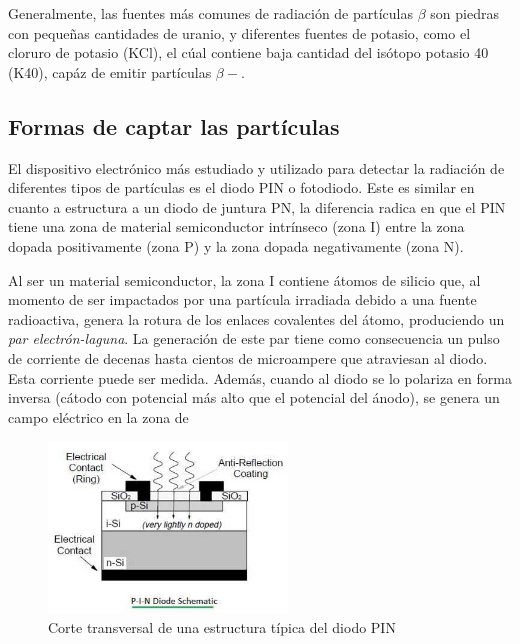 \documentclass[a4paper,conference]{IEEEtran}
\begin{document}
        Generalmente, las fuentes más comunes de radiación de partículas $\beta$
        son piedras con pequeñas cantidades de uranio, y diferentes fuentes de
        potasio, como el cloruro de potasio (KCl), el cúal contiene baja
        cantidad del isótopo potasio 40 (K40), capáz de emitir partículas
        $\beta-$.

    \subsection{Formas de captar las partículas}
       El dispositivo electrónico más estudiado y utilizado para detectar
       la radiación de diferentes tipos de partículas es el diodo PIN o
       fotodiodo. Este es similar en cuanto a estructura a un diodo de juntura
       PN, la diferencia radica en que el PIN tiene una zona de material
       semiconductor intrínseco (zona I) entre la zona dopada positivamente (zona P) y la zona
       dopada negativamente (zona N).\par
       Al ser un material semiconductor, la zona I contiene átomos
       de silicio que, al momento de ser impactados por una partícula
       irradiada debido a una fuente radioactiva, genera la rotura de los
       enlaces covalentes del átomo, produciendo un \emph{par electrón-laguna}.
       La generación de este par tiene como consecuencia un pulso de corriente
       de decenas hasta cientos de microampere que atraviesan al diodo. Esta
       corriente puede ser medida. Además, cuando al diodo se lo polariza en
       forma inversa (cátodo con potencial más alto que el potencial del ánodo),
       se genera un campo eléctrico en la zona de
       \newpage
       \begin{figure}[!t]
           \centering
           \includegraphics[width=2.5inch]{img/PIN_structure.jpg}
           \caption{Corte transversal de una estructura típica del diodo PIN}
           \label{fig:pin}
       \end{figure}



\nocite{*}
\end{document}

